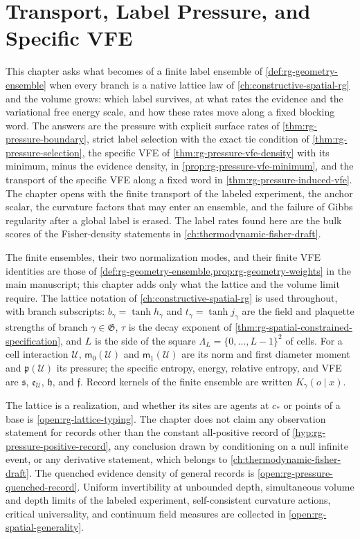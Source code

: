 \chapter{Transport, Label Pressure, and Specific VFE}
\label{ch:normalized-geometry}
\label{ch:geometry-pressure}

This chapter asks what becomes of a finite label ensemble of
\cref{def:rg-geometry-ensemble} when every branch is a native lattice law of
\cref{ch:constructive-spatial-rg} and the volume grows: which label survives,
at what rates the evidence and the variational free energy scale, and how
these rates move along a fixed blocking word. The answers are the pressure
with explicit surface rates of \cref{thm:rg-pressure-boundary}, strict label
selection with the exact tie condition of \cref{thm:rg-pressure-selection},
the specific VFE of \cref{thm:rg-pressure-vfe-density} with its minimum,
minus the evidence density, in \cref{prop:rg-pressure-vfe-minimum}, and the
transport of the specific VFE along a fixed word in
\cref{thm:rg-pressure-induced-vfe}. The chapter opens with the finite
transport of the labeled experiment, the anchor scalar, the curvature
factors that may enter an ensemble, and the failure of Gibbs regularity after
a global label is erased. The label rates found here are the bulk scores of
the Fisher-density statements in \cref{ch:thermodynamic-fisher-draft}.

The finite ensembles, their two normalization modes, and their finite VFE
identities are those of \cref{def:rg-geometry-ensemble,prop:rg-geometry-weights}
in the main manuscript; this chapter adds only what the lattice and the
volume limit require. The lattice notation of
\cref{ch:constructive-spatial-rg} is used throughout, with branch subscripts:
$b_\gamma=\tanh h_\gamma$ and $t_\gamma=\tanh j_\gamma$ are the field and
plaquette strengths of branch $\gamma\in\mathfrak G$, $\tau$ is the decay
exponent of \cref{thm:rg-spatial-constrained-specification}, and $L$ is the
side of the square $\Lambda_L=\{0,\ldots,L-1\}^2$ of cells. For a cell
interaction $\mathscr U$, $\mathsf m_0(\mathscr U)$ and $\mathsf m_1(\mathscr U)$ are its norm
and first diameter moment and $\mathfrak p(\mathscr U)$ its pressure; the specific
entropy, energy, relative entropy, and VFE are $\mathfrak s$,
$\mathfrak e_{\mathscr U}$, $\mathfrak h$, and $\mathfrak f$. Record kernels of the
finite ensemble are written $K_\gamma(o\mid x)$.

The lattice is a realization, and whether its sites are agents at $c_*$ or
points of a base is \cref{open:rg-lattice-typing}. The chapter does not claim
any observation statement for records other than the constant all-positive
record of \cref{hyp:rg-pressure-positive-record}, any conclusion drawn by
conditioning on a null infinite event, or any derivative statement, which
belongs to \cref{ch:thermodynamic-fisher-draft}. The quenched evidence
density of general records is \cref{open:rg-pressure-quenched-record}. Uniform invertibility at
unbounded depth, simultaneous volume and depth limits of the labeled
experiment, self-consistent curvature actions, critical universality, and
continuum field measures are collected in \cref{open:rg-spatial-generality}.

